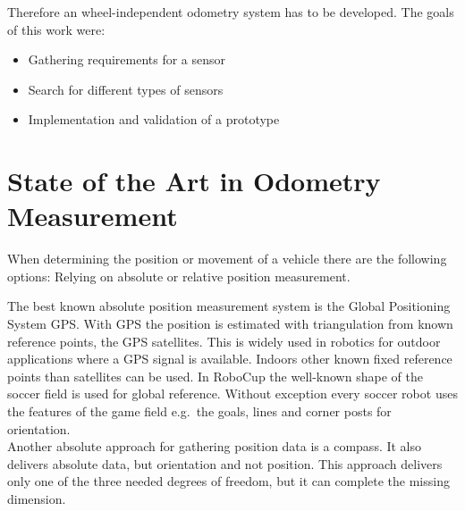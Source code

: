 \documentclass[12pt,a4paper]{article}
\begin{document}
Therefore an wheel-independent odometry system has to be developed.
The goals of this work were:
\begin{itemize}
  \item Gathering requirements for a sensor
  \item Search for different types of sensors
  \item Implementation and validation of a prototype
\end{itemize}




\clearpage
\section{State of the Art in Odometry Measurement}

When determining the position or movement of a vehicle there are the following options: 
Relying on absolute or relative position measurement.

The best known absolute position measurement system is the Global Positioning System GPS.
With GPS the position is estimated with triangulation from known reference points, the GPS satellites. %
This is widely used in robotics for outdoor applications where a GPS signal is available.
Indoors other known fixed reference points than satellites can be used.
In RoboCup the well-known shape of the soccer field is used for global reference.
Without exception every soccer robot uses the features of the game field e.g.\ the goals, lines and corner posts for orientation.\\
Another absolute approach for gathering position data is a compass.
It also delivers absolute data, but orientation and not position. 
This approach delivers only one of the three needed degrees of freedom, but it can complete the missing dimension.

\end{document}
